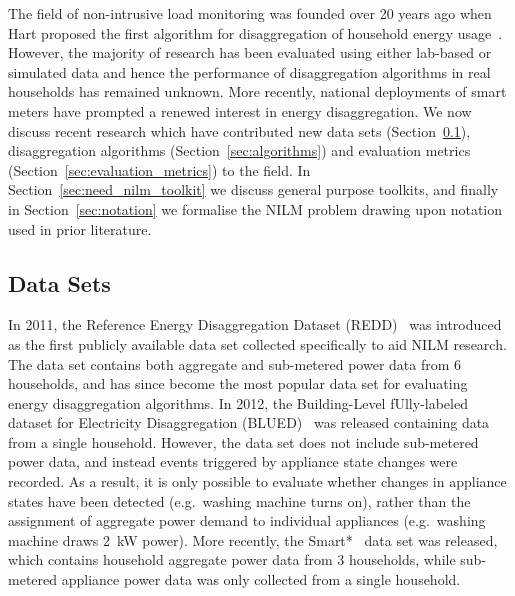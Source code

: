 \documentclass{sig-alternate}
\newcommand{\bluecolor}[1]{\textcolor{blue}{#1}}
\newcommand{\secref}[1]{Section~\ref{#1}}
\begin{document}
\noindent
The field of non-intrusive load monitoring was founded over 20 years ago when Hart proposed the first algorithm for disaggregation of household energy usage~\cite{hart_1992,armel_2013}. 
However, the majority of research has been evaluated using either lab-based or simulated data and hence the performance of disaggregation algorithms in real households has remained unknown. More recently, national deployments of smart meters have prompted a renewed interest in energy disaggregation. 
We now discuss recent research which have contributed new data sets (\secref{sec:datasets}), disaggregation algorithms (\secref{sec:algorithms}) and evaluation metrics (\secref{sec:evaluation_metrics}) to the field. 
In \secref{sec:need_nilm_toolkit} we discuss general purpose toolkits, and finally in \secref{sec:notation} we formalise the NILM problem drawing upon notation used in prior literature.

\subsection{Data Sets}
\label{sec:datasets}
\noindent In 2011, the Reference Energy Disaggregation Dataset (REDD)~\cite{redd} was introduced as the first publicly available data set collected specifically to aid NILM research. The data set contains both aggregate and sub-metered power data from 6 households, and has since become the most popular data set for evaluating energy disaggregation algorithms. In 2012, the Building-Level fUlly-labeled dataset for Electricity Disaggregation (BLUED)~\cite{blued} was released containing data from a single household. However, the data set does not include sub-metered power data, and instead events triggered by appliance state changes were recorded. 
As a result, it is only possible to evaluate whether changes in appliance states have been detected (e.g.\ washing machine turns on), rather than the assignment of aggregate power demand to individual appliances (e.g.\ washing machine draws 2~kW power). More recently, the Smart*~\cite{smart} data set was released, which contains household aggregate power data from 3 households, while sub-metered appliance power data was only collected from a single household.
\end{document}
